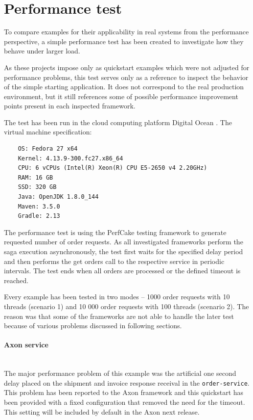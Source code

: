 \documentclass[oneside,
  digital, %
  table,   %
  lof,     %
  lot,     %
]{fithesis3}
\newcommand{\newlinepar}[1]{\paragraph{#1}\needspace{4\baselineskip}\mbox{}\\}
\begin{document}
\section{Performance test}

To compare examples for their applicability in real systems from the performance perspective, a simple performance test has been created to investigate how they behave under larger load.

As these projects impose only as quickstart examples which were not adjusted for performance problems, this test serves only as a reference to inspect the behavior of the simple starting application. It does not correspond to the real production environment, but it still references some of possible performance improvement points present in each inspected framework.

The test has been run in the cloud computing platform Digital Ocean \cite{digital-ocean}. The virtual machine specification:

\begin{verbatim}
    OS: Fedora 27 x64
    Kernel: 4.13.9-300.fc27.x86_64
    CPU: 6 vCPUs (Intel(R) Xeon(R) CPU E5-2650 v4 2.20GHz)
    RAM: 16 GB
    SSD: 320 GB
    Java: OpenJDK 1.8.0_144
    Maven: 3.5.0
    Gradle: 2.13
\end{verbatim}

The performance test is using the PerfCake \cite{perfcake} testing framework to generate requested number of order requests. As all investigated frameworks perform the saga execution asynchronously, the test first waits for the specified delay period and then performs the get orders call to the respective service in periodic intervals. The test ends when all orders are processed or the defined timeout is reached.

Every example has been tested in two modes -- 1000 order requests with 10 threads (scenario 1) and 10 000 order requests with 100 threads (scenario 2). The reason was that some of the frameworks are not able to handle the later test because of various problems discussed in following sections.

\newlinepar{Axon service}

The major performance problem of this example was the artificial one second delay placed on the shipment and invoice response receival in the \texttt{order-service}. This problem has been reported to the Axon framework and this quickstart has been provided with a fixed configuration that removed the need for the timeout. This setting will be included by default in the Axon next release. 
\end{document}
